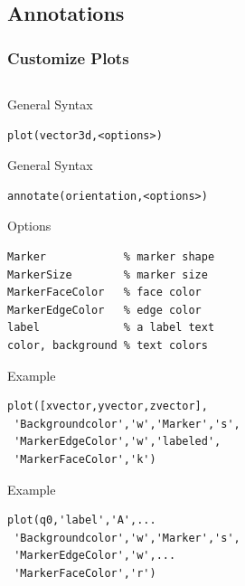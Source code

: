 \documentclass[compress]{beamer}
\begin{document}
\subsection*{Annotations}

\begin{frame}[fragile]
  \frametitle{Customize Plots}

\begin{columns}
  \begin{column}{8.5cm}

\begin{overprint}
  General Syntax%
\begin{lstlisting}[style=input]
plot(vector3d,<options>)
\end{lstlisting}
  General Syntax
\begin{lstlisting}[style=input]
annotate(orientation,<options>)
\end{lstlisting}
\end{overprint}

Options
\begin{lstlisting}[style=input]
Marker            % marker shape
MarkerSize        % marker size
MarkerFaceColor   % face color
MarkerEdgeColor   % edge color
label             % a label text
color, background % text colors
\end{lstlisting}

\begin{overprint}
  Example
\begin{lstlisting}[style=input]
plot([xvector,yvector,zvector],
 'Backgroundcolor','w','Marker','s',
 'MarkerEdgeColor','w','labeled',
 'MarkerFaceColor','k')
\end{lstlisting}

Example
\begin{lstlisting}[style=input]
plot(q0,'label','A',...
 'Backgroundcolor','w','Marker','s',
 'MarkerEdgeColor','w',...
 'MarkerFaceColor','r')
\end{lstlisting}

\end{overprint}

\end{column}


\end{columns}
\end{frame}
\end{document}
